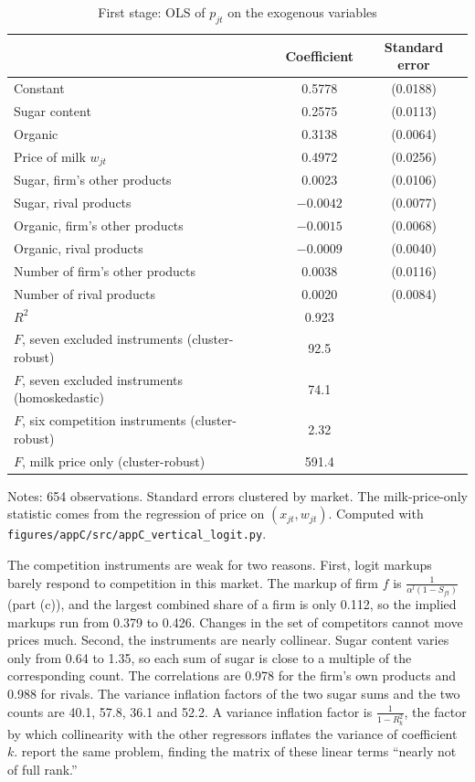 \begin{table}[htbp]
\centering
\caption{First stage: OLS of $p_{jt}$ on the exogenous variables}
\label{tab:C-firststage}
\small
\begin{tabular}{@{}lcc@{}}
\toprule
 & Coefficient & Standard error \\
\midrule
Constant & 0.5778 & (0.0188) \\
Sugar content & 0.2575 & (0.0113) \\
Organic & 0.3138 & (0.0064) \\
Price of milk $w_{jt}$ & 0.4972 & (0.0256) \\
Sugar, firm's other products & 0.0023 & (0.0106) \\
Sugar, rival products & $-0.0042$ & (0.0077) \\
Organic, firm's other products & $-0.0015$ & (0.0068) \\
Organic, rival products & $-0.0009$ & (0.0040) \\
Number of firm's other products & 0.0038 & (0.0116) \\
Number of rival products & 0.0020 & (0.0084) \\
\midrule
$R^2$ & 0.923 & \\
$F$, seven excluded instruments (cluster-robust) & 92.5 & \\
$F$, seven excluded instruments (homoskedastic) & 74.1 & \\
$F$, six competition instruments (cluster-robust) & 2.32 & \\
$F$, milk price only (cluster-robust) & 591.4 & \\
\bottomrule
\end{tabular}

\vspace{3pt}
\begin{minipage}{0.97\textwidth}
\footnotesize Notes: 654 observations. Standard errors clustered by market. The milk-price-only
statistic comes from the regression of price on $(x_{jt}, w_{jt})$.
Computed with \texttt{figures/appC/src/appC\_vertical\_logit.py}.
\end{minipage}
\end{table}

The competition instruments are weak for two reasons. First, logit markups barely respond to competition in this
market. The markup of firm $f$ is $\frac{1}{\alpha^l(1 - S_{ft})}$ (part (c)), and the largest combined share of a
firm is only 0.112, so the implied markups run from 0.379 to 0.426. Changes in the set of competitors cannot move prices
much. Second, the instruments are nearly collinear. Sugar content varies only from 0.64 to 1.35, so each sum of sugar
is close to a multiple of the corresponding count. The correlations are 0.978 for the firm's own products and 0.988 for
rivals. The variance inflation factors of the two sugar sums and the two counts are 40.1, 57.8, 36.1 and 52.2. A
variance inflation factor is $\frac{1}{1 - R_k^2}$, the factor by which collinearity with the other regressors inflates
the variance of coefficient $k$.
\citet[p.~861]{BerryLevinsohnPakes1995} report the same problem, finding the matrix of these linear terms ``nearly not
of full rank.''

